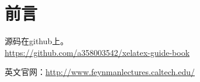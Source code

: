 \documentclass[12pt,oneside]{book}
\begin{document}
\frontmatter

\author{费曼}
\titleLC

\chapter*{前言}
\begin{common-format}
源码在github上。\\
\href{https://github.com/a358003542/xelatex-guide-book}{https://github.com/a358003542/xelatex-guide-book}

英文官网：\href{http://www.feynmanlectures.caltech.edu/}{http://www.feynmanlectures.caltech.edu/}


\end{common-format}


\setcounter{tocdepth}{2}
\tableofcontents
\end{document}
